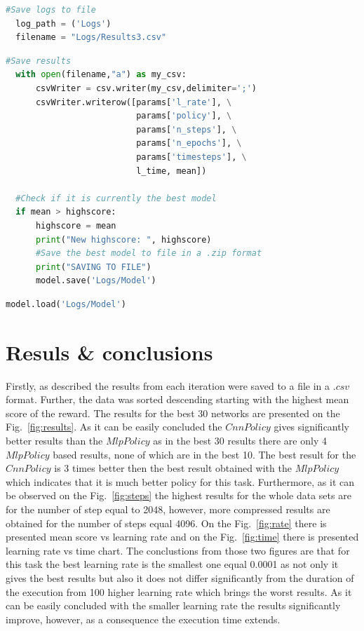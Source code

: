 \documentclass[runningheads]{llncs}
\begin{document}
\begin{lstlisting}[caption={Log files creation}, language=Python, label={lst:logs}]
  #Save logs to file
  log_path = ('Logs')
  filename = "Logs/Results3.csv"
\end{lstlisting}

\begin{lstlisting}[caption={Pretrained model and parameters saving}, language=Python, label={lst:trained}]
  #Save results
  with open(filename,"a") as my_csv:
      csvWriter = csv.writer(my_csv,delimiter=';')
      csvWriter.writerow([params['l_rate'], \
                          params['policy'], \
                          params['n_steps'], \
                          params['n_epochs'], \
                          params['timesteps'], \
                          l_time, mean])
  
  #Check if it is currently the best model
  if mean > highscore:
      highscore = mean
      print("New highscore: ", highscore)
      #Save the best model to file in a .zip format
      print("SAVING TO FILE")
      model.save('Logs/Model')
\end{lstlisting}

\begin{lstlisting}[caption={Loading pretrained network}, language=Python, label={lst:load}]
  model.load('Logs/Model')
\end{lstlisting}

\section{Resuls \& conclusions}
Firstly, as described the results from each iteration were saved to a file in a $.csv$ format. Further, the data was sorted descending starting with the highest mean score of the reward. The results for the best 30 networks are presented on the Fig.~\ref{fig:results}. As it can be easily concluded the $CnnPolicy$ gives significantly better results than the $MlpPolicy$ as in the best 30 results there are only 4 $MlpPolicy$ based results, none of which are in the best 10. The best result for the $CnnPolicy$ is 3 times better then the best result obtained with the $MlpPolicy$ which indicates that it is much better policy for this task. Furthermore, as it can be observed on the Fig.~\ref{fig:steps} the highest results for the whole data sets are for the number of step equal to 2048, however, more compressed results are obtained for the number of steps equal 4096. On the Fig.~\ref{fig:rate} there is presented mean score vs learning rate and on the Fig.~\ref{fig:time} there is presented learning rate vs time chart. The conclustions from those two figures are that for this task the best learning rate is the smallest one equal 0.0001 as not only it gives the best results but also it does not differ significantly from the duration of the execution from 100 higher learning rate which brings the worst results. As it can be easily concluded with the smaller learning rate the results significantly improve, however, as a consequence the execution time extends.
\end{document}
